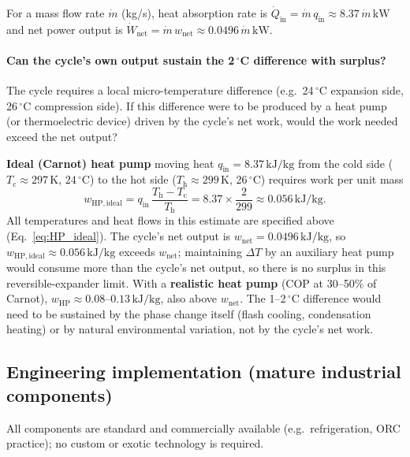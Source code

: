 \documentclass[11pt,a4paper]{article}
\begin{document}
For a mass flow rate $\dot{m}$ (kg/s), heat absorption rate is
$\dot{Q}_{\mathrm{in}} = \dot{m}\,q_{\mathrm{in}} \approx 8.37\,\dot{m}\,\mathrm{kW}$
and net power output is
$\dot{W}_{\mathrm{net}} = \dot{m}\,w_{\mathrm{net}} \approx 0.0496\,\dot{m}\,\mathrm{kW}$.

\paragraph{Can the cycle's own output sustain the 2\,$^\circ$C difference with surplus?}
The cycle requires a local micro-temperature difference (e.g.\ 24\,$^\circ$C expansion
side, 26\,$^\circ$C compression side). If this difference were to be produced
by a heat pump (or thermoelectric device) driven by the cycle's net work, would
the work needed exceed the net output?

\textbf{Ideal (Carnot) heat pump} moving heat $q_{\mathrm{in}} = 8.37\,\mathrm{kJ}/\mathrm{kg}$
from the cold side ($T_{\mathrm{c}} \approx 297\,\mathrm{K}$, 24\,$^\circ$C) to the
hot side ($T_{\mathrm{h}} \approx 299\,\mathrm{K}$, 26\,$^\circ$C) requires work per
unit mass
\begin{equation}
\label{eq:HP_ideal}
w_{\mathrm{HP,ideal}} = q_{\mathrm{in}}\,\frac{T_{\mathrm{h}} - T_{\mathrm{c}}}{T_{\mathrm{h}}}
= 8.37 \times \frac{2}{299} \approx 0.056\,\mathrm{kJ}/\mathrm{kg}.
\end{equation}
All temperatures and heat flows in this estimate are specified above (Eq.~\ref{eq:HP_ideal}). The cycle's net output is $w_{\mathrm{net}} = 0.0496\,\mathrm{kJ}/\mathrm{kg}$, so
$w_{\mathrm{HP,ideal}} \approx 0.056\,\mathrm{kJ}/\mathrm{kg}$ exceeds $w_{\mathrm{net}}$; maintaining $\Delta T$ by an auxiliary heat pump would consume more than the cycle's net output, so there is no surplus in this reversible-expander limit. With a \textbf{realistic heat pump} (COP at 30--50\% of Carnot), $w_{\mathrm{HP}} \approx 0.08$--$0.13\,\mathrm{kJ}/\mathrm{kg}$, also above $w_{\mathrm{net}}$. The 1--2\,$^\circ$C difference would need to be sustained by the phase change itself (flash cooling, condensation heating) or by natural environmental variation, not by the cycle's net work.

\subsection{Engineering implementation (mature industrial components)}
\label{sec:engineering_impl}

All components are standard and commercially available (e.g.\ refrigeration, ORC practice); no custom or exotic technology is required.
\end{document}
